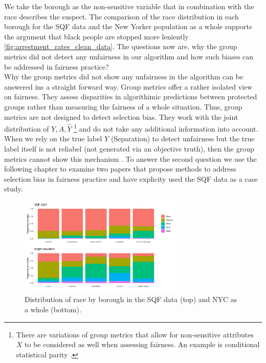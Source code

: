 We take the borough as the non-sensitive variable that in combination with the race describes the suspect.  The comparison of the race distribution in each borough for the SQF data and the New Yorker population as a whole supports the argument that black people are stopped more leniently \autoref{fig:arrestment_rates_clean_data}. The questions now are, why the group metrics did not detect any unfairness in our algorithm and how such biases can be addressed in fairness practice? \\
Why the group metrics did not show any unfairness in the algorithm can be answered ins a straight forward way. Group metrics offer a rather isolated view on fairness. They assess disparities in algorithimic predictions between protected groups rather than measuring the fairness of a whole situation. Thus, group metrics are not designed to detect selection bias. They work with the joint distribution of $Y, A, \hat{Y}$ \footnote{There are variations of group metrics that allow for non-sensitive attributes $X$ to be considered as well when assessing fairness. An example is conditional statistical parity \cite{verma2018}.} 
and do not take any additional information into account. When we rely on the true label $Y$ (Separation) to detect unfairness but the true label itself is not reliabel (not generated via an objective truth), then the group metrics cannot show this mechanism \cite{castelnovo2022}.
To answer the second question we use the following chapter to examine two papers that propose methods to address selection bias in fairness practice and have explicity used the SQF data as a case study.

\begin{figure}
    \centering
    \includegraphics[width=0.7\textwidth]{../figures/sqf_case_study_plot11.png}
    \caption {Distribution of race by borough in the SQF data (top) and NYC as a whole (bottom).}
    \label{fig:borough_race_distribution}
\end{figure}

